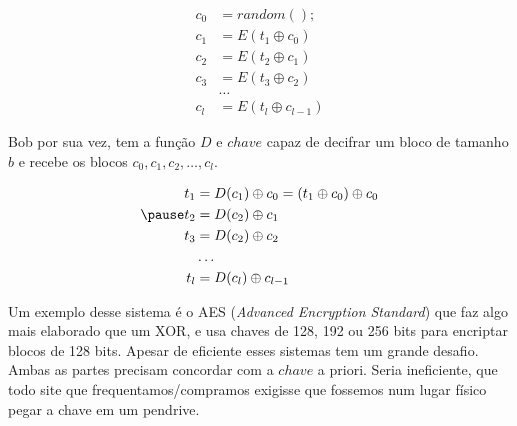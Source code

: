 \begin{frame}{}{}
\begin{align}
c_0 & = random();\\
c_1 & = E(t_1 \oplus c_0)\\
c_2 & = E(t_2 \oplus c_1)\\
c_3 & = E(t_3 \oplus c_2)\\
& \ldots \\
c_l & = E(t_l \oplus c_{l-1})
\end{align}
\end{frame}



\begin{frame}{}{}
\begin{itemize}
\pitem Bob por sua vez, tem a função $D$ e $chave$ capaz de decifrar um bloco de tamanho $b$ e recebe os blocos $c_0, c_1, c_2, \ldots, c_l$.
\end{itemize}
\begin{align}
t_1 &= D(c_1) \oplus c_0 = (t_1 \oplus c_0) \oplus c_0\\\ppause
t_2 &= D(c_2) \oplus c_1 \\
t_3 &= D(c_2) \oplus c_2 \\
& \ldots \\
t_l &= D(c_l) \oplus c_{l-1}
\end{align}
\end{frame}



\begin{frame}{}{}
\begin{itemize}
\pitem Um exemplo desse sistema é o AES ({\it Advanced Encryption Standard}) que faz algo mais elaborado que um XOR, e usa chaves de 128, 192 ou 256 bits para encriptar blocos de 128 bits.
\pitem Apesar de eficiente esses sistemas tem um grande desafio. Ambas as partes precisam concordar com a $chave$ a priori.
\pitem Seria ineficiente, que todo site que frequentamos/compramos exigisse que fossemos num lugar físico pegar a chave em um pendrive.
\end{itemize}
\end{frame}






